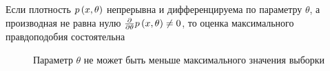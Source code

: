 \begin{theorem}
  Если плотность $p\left(x,\theta\right)$
  непрерывна и дифференцируема по параметру $\theta$,
  а производная не равна нулю
  $\frac{\partial}{\partial\theta}p\left(x,\theta\right)\neq 0$,
  то оценка максимального правдоподобия состоятельна
\end{theorem}

\begin{figure}[h!]
  \center
  \caption{Параметр $\theta$ не может быть меньше максимального значения
    выборки}
  \label{fig:tikz:maximumLikelihoodEstimatorExample}
\end{figure}

